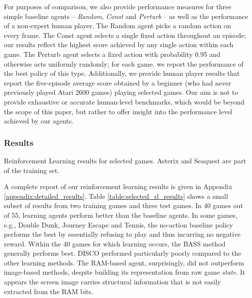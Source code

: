 \documentclass[twoside,11pt]{article}
\newcommand{\gamename}[1]{{\sc #1}}
\begin{document}
For purposes of comparison, we also provide performance measures for three simple baseline agents -- \emph{Random}, \emph{Const} and \emph{Perturb} -- as well as the performance of a non-expert human player. The Random agent picks a random action on every frame. The Const agent selects a single fixed action throughout an episode; our results reflect the highest score achieved by any single action within each game. The Perturb agent selects a fixed action with probability 0.95 and otherwise acts uniformly randomly; for each game, we report the performance of the best policy of this type. 
Additionally, we provide human player results that report the five-episode average score obtained by a beginner (who had never previously played Atari 2600 games) playing selected games. Our aim is not to provide exhaustive or accurate human-level benchmarks, which would be beyond the scope of this paper, but rather to offer insight into the performance level achieved by our agents. 

\subsubsection{Results}
\label{sec:RL:results}

\begin{table}
\small
\begin{center}

\end{center}
\vspace{-1.6em}
\caption{Reinforcement Learning results for selected games. \gamename{Asterix} and \gamename{Seaquest} are part of the training set.\label{table:selected_rl_results}}
\end{table}

A complete report of our reinforcement learning results is given in Appendix 
\ref{appendix:detailed_results}. Table \ref{table:selected_rl_results} shows a small subset of 
results from two training games and three test games.  In 40 games out of 55, learning agents perform 
better than the baseline agents.  In some games, e.g., \gamename{Double Dunk}, \gamename{Journey Escape} and \gamename{Tennis}, the no-action baseline policy performs the best by essentially refusing to play and thus incurring no negative reward.  Within the 40 games for which learning occurs, the BASS method
generally performs best. DISCO performed particularly poorly compared to the other learning methods. 
The RAM-based agent, surprisingly, did not outperform image-based methods, despite building its representation from raw game {\em state}. It appears the screen image carries structural information that is not easily extracted from the RAM bits.
\end{document}
